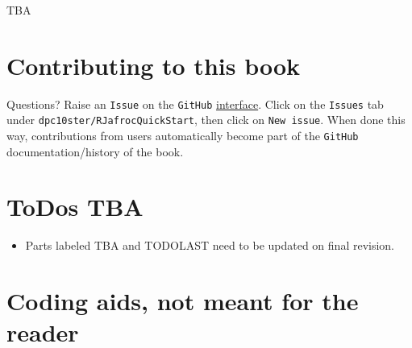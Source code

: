\documentclass[
]{book}
\providecommand{\tightlist}{%
  \setlength{\itemsep}{0pt}\setlength{\parskip}{0pt}}
\begin{document}
TBA

\hypertarget{contributing-to-this-book}{%
\section*{Contributing to this book}\label{contributing-to-this-book}}

Questions? Raise an \texttt{Issue} on the \texttt{GitHub} \href{https://github.com/dpc10ster/RJafrocQuickStart}{interface}. Click on the \texttt{Issues} tab under \texttt{dpc10ster/RJafrocQuickStart}, then click on \texttt{New\ issue}. When done this way, contributions from users automatically become part of the \texttt{GitHub} documentation/history of the book.

\hypertarget{todos-tba}{%
\section*{ToDos TBA}\label{todos-tba}}

\begin{itemize}
\tightlist
\item
  Parts labeled TBA and TODOLAST need to be updated on final revision.
\end{itemize}

\hypertarget{coding-aids-not-meant-for-the-reader}{%
\section*{Coding aids, not meant for the reader}\label{coding-aids-not-meant-for-the-reader}}
\end{document}
